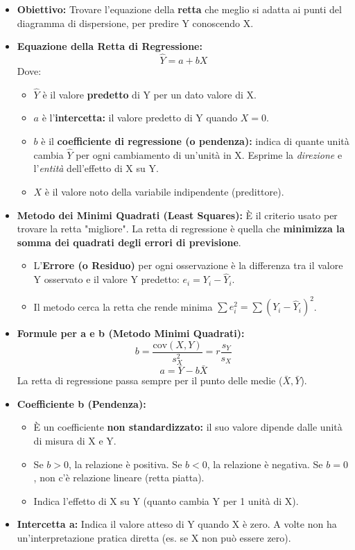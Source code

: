 \documentclass[12pt, a4paper]{article}
\newcommand{\rpearson}{r} %
\newcommand{\cov}{\text{cov}} %
\newcommand{\Yhat}{\hat{Y}} %
\newcommand{\bcoeff}{b} %
\newcommand{\acoeff}{a} %
\newcommand{\resid}{e} %
\begin{document}
\begin{itemize}
    \item \textbf{Obiettivo:} Trovare l'equazione della \textbf{retta} che meglio si adatta ai punti del diagramma di dispersione, per predire Y conoscendo X.
    \item \textbf{Equazione della Retta di Regressione:}
      $$ \Yhat = \acoeff + \bcoeff X $$
      Dove:
        \begin{itemize}
            \item $\Yhat$ è il valore \textbf{predetto} di Y per un dato valore di X.
            \item $\acoeff$ è l'\textbf{intercetta:} il valore predetto di Y quando $X=0$.
            \item $\bcoeff$ è il \textbf{coefficiente di regressione (o pendenza):} indica di quante unità cambia $\Yhat$ per ogni cambiamento di un'unità in X. Esprime la \textit{direzione} e l'\textit{entità} dell'effetto di X su Y.
            \item $X$ è il valore noto della variabile indipendente (predittore).
        \end{itemize}
    \item \textbf{Metodo dei Minimi Quadrati (Least Squares):} È il criterio usato per trovare la retta "migliore". La retta di regressione è quella che \textbf{minimizza la somma dei quadrati degli errori di previsione}.
        \begin{itemize}
            \item L'\textbf{Errore (o Residuo)} per ogni osservazione è la differenza tra il valore Y osservato e il valore Y predetto: $\resid_i = Y_i - \Yhat_i$.
            \item Il metodo cerca la retta che rende minima $\sum \resid_i^2 = \sum (Y_i - \Yhat_i)^2$.
        \end{itemize}
    \item \textbf{Formule per a e b (Metodo Minimi Quadrati):}
      $$ \bcoeff = \frac{\cov(X, Y)}{s^2_X} = \rpearson \frac{s_Y}{s_X} $$
      $$ \acoeff = \bar{Y} - \bcoeff \bar{X} $$
      La retta di regressione passa sempre per il punto delle medie ($\bar{X}, \bar{Y}$).
    \item \textbf{Coefficiente b (Pendenza):}
        \begin{itemize}
            \item È un coefficiente \textbf{non standardizzato:} il suo valore dipende dalle unità di misura di X e Y.
            \item Se $\bcoeff > 0$, la relazione è positiva. Se $\bcoeff < 0$, la relazione è negativa. Se $\bcoeff = 0$, non c'è relazione lineare (retta piatta).
            \item Indica l'effetto di X su Y (quanto cambia Y per 1 unità di X).
        \end{itemize}
    \item \textbf{Intercetta a:} Indica il valore atteso di Y quando X è zero. A volte non ha un'interpretazione pratica diretta (es. se X non può essere zero).
\end{itemize}
\end{document}
